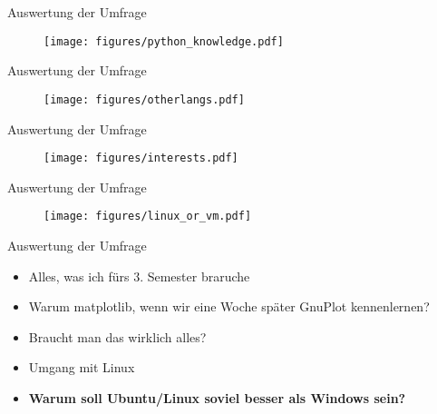 \begin{frame}{Auswertung der Umfrage}
    \begin{figure}
        \centering
        \texttt{[image: figures/python\_knowledge.pdf]}
    \end{figure}
\end{frame}
\begin{frame}{Auswertung der Umfrage}
    \begin{figure}
        \centering
        \texttt{[image: figures/otherlangs.pdf]}
    \end{figure}
\end{frame}
\begin{frame}{Auswertung der Umfrage}
    \begin{figure}
        \centering
        \texttt{[image: figures/interests.pdf]}
    \end{figure}
\end{frame}
\begin{frame}{Auswertung der Umfrage}
    \begin{figure}
        \centering
        \texttt{[image: figures/linux\_or\_vm.pdf]}
    \end{figure}
\end{frame}
\begin{frame}{Auswertung der Umfrage}
    \begin{itemize}
        \item Alles, was ich fürs 3. Semester braruche
        \item Warum matplotlib, wenn wir eine Woche später GnuPlot kennenlernen?
        \item Braucht man das wirklich alles?
        \item Umgang mit Linux
        \item \textbf{Warum soll Ubuntu/Linux soviel besser als Windows sein?}
    \end{itemize}
\end{frame}
